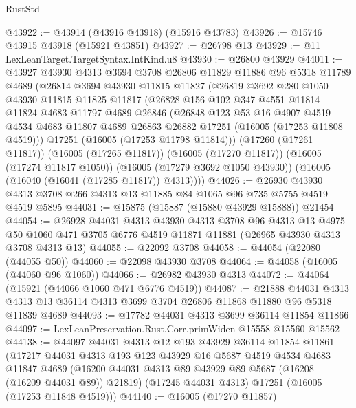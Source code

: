 \begin{lexlean}{RustStd}
\begin{coremodule}
@43922 := @43914 (@43916 @43918) (@15916 @43783)
@43926 := @15746 @43915 @43918 (@15921 @43851)
@43927 := @26798 @13
@43929 := @11 LexLeanTarget.TargetSyntax.IntKind.u8
@43930 := @26800 @43929
@44011 := @43927
    @43930
    @4313
    @3694
    @3708
    @26806
    @11829
    @11886
    @96
    @5318
    @11789
    @4689
    (@26814
      @3694
      @43930
      @11815
      @11827
      (@26819
        @3692
        @280
        @1050
        @43930
        @11815
        @11825
        @11817
        (@26828
          @156
          @102
          @347
          @4551
          @11814
          @11824
          @4683
          @11797
          @4689
          @26846
          (@26848
            @123
            @53
            @16
            @4907
            @4519
            @4534
            @4683
            @11807
            @4689
            @26863
            @26882
            @17251
            (@16005 (@17253 @11808 @4519)))
          @17251
          (@16005 (@17253 @11798 @11814)))
        (@17260 (@17261 @11817))
        (@16005 (@17265 @11817))
        (@16005 (@17270 @11817))
        (@16005 (@17274 @11817 @1050))
        (@16005 (@17279 @3692 @1050 @43930))
        (@16005 (@16040 (@16041 (@17285 @11817)) @4313))))
@44026 := @26930 @43930 @4313 @3708 @266 @4313 @13 @11885 @84 @1065 @96 @735 @5755 @4519 @4519 @5895
@44031 := @15875 (@15887 (@15880 @43929 @15888)) @21454
@44054 := @26928
    @44031
    @4313
    @43930
    @4313
    @3708
    @96
    @4313
    @13
    @4975
    @50
    @1060
    @471
    @3705
    @6776
    @4519
    @11871
    @11881
    (@26965 @43930 @4313 @3708 @4313 @13)
@44055 := @22092 @3708
@44058 := @44054 (@22080 (@44055 @50))
@44060 := @22098 @43930 @3708
@44064 := @44058 (@16005 (@44060 @96 @1060))
@44066 := @26982 @43930 @4313
@44072 := @44064 (@15921 (@44066 @1060 @471 @6776 @4519))
@44087 := @21888
    @44031
    @4313
    @4313
    @13
    @36114
    @4313
    @3699
    @3704
    @26806
    @11868
    @11880
    @96
    @5318
    @11839
    @4689
@44093 := @17782 @44031 @4313 @3699 @36114 @11854 @11866
@44097 := LexLeanPreservation.Rust.Corr.primWiden @15558 @15560 @15562
@44138 := @44097
    @44031
    @4313
    @12
    @193
    @43929
    @36114
    @11854
    @11861
    (@17217
      @44031
      @4313
      @193
      @123
      @43929
      @16
      @5687
      @4519
      @4534
      @4683
      @11847
      @4689
      (@16200 @44031 @4313 @89 @43929 @89 @5687 (@16208 (@16209 @44031 @89)) @21819)
      (@17245 @44031 @4313)
      @17251
      (@16005 (@17253 @11848 @4519)))
@44140 := @16005 (@17270 @11857)

\end{coremodule}
\end{lexlean}
